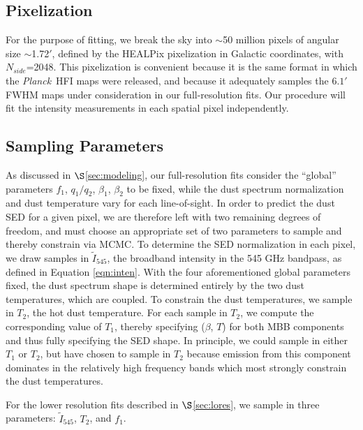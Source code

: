 \documentclass{emulateapj}
\newcommand{\PLANCK}{{\it Planck}}
\begin{document}

\subsection{Pixelization}
\label{sec:pix}
For the purpose of fitting, we break the sky into $\sim$50 million pixels of 
angular size $\sim$1.72$'$, defined by the HEALPix pixelization in Galactic 
coordinates, with $N_{side}$=2048. This pixelization is convenient because it 
is the same format in which the \PLANCK~HFI maps were released, and because it 
adequately samples the $6.1'$ FWHM maps under consideration in our 
full-resolution fits. Our procedure will fit the intensity measurements in each
spatial pixel independently.

\subsection{Sampling Parameters}
\label{sec:samp}
As discussed in $\S$\ref{sec:modeling}, our full-resolution fits
consider the ``global'' parameters $f_1$, $q_1/q_2$, $\beta_1$, $\beta_2$ to be
 fixed, while the dust spectrum normalization and dust temperature vary for
each line-of-sight. In order to predict the dust SED for a given pixel, we are 
therefore left with two remaining degrees of freedom, and must choose an 
appropriate set of two parameters to sample and thereby constrain via MCMC. To 
determine the SED normalization in each pixel, we draw samples in 
$\tilde{I}_{545}$, the broadband intensity in the 545 GHz bandpass, as defined 
in Equation \ref{eqn:inten}. With the four aforementioned global parameters 
fixed, the dust spectrum shape is determined entirely by the two dust 
temperatures, which are coupled. To constrain the dust temperatures,
 we sample in $T_2$, the hot dust temperature. For each sample in $T_2$, we 
compute the corresponding value of $T_1$, thereby specifying ($\beta$, $T$) for
both MBB components and thus fully specifying the SED shape. In principle,
we could sample in either $T_1$ or $T_2$, but have chosen to sample in $T_2$ 
because emission from this component dominates in the relatively high frequency
bands which most strongly constrain the dust temperatures.

For the lower resolution fits described in $\S$\ref{sec:lores}, we sample
in three parameters: $\tilde{I}_{545}$, $T_2$, and $f_1$.

\end{document}
